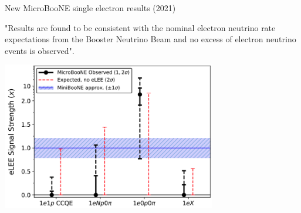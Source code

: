 \begin{frame}[t]{New MicroBooNE single electron results (2021)}

{\small
  "Results are found to be consistent with the nominal electron neutrino
  rate expectations from the Booster Neutrino Beam and no excess of electron neutrino events is observed".\\
}
\vspace{0.1cm}

\begin{center}
    \includegraphics[width=0.70\textwidth]{./images/beyond3nu/accelerator/uB_2021_e_summary}
\end{center}

\end{frame}
%
%
%

